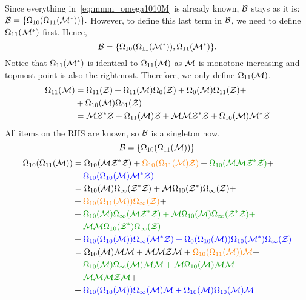 \documentclass[12pt, a4paper, twoside]{report}
\begin{document}
Since everything in~\eqref{eq:mmm_omega1010M} is already known, $\mathcal{B}$ stays as it is: $\mathcal{B} = \{\Omega_{10}(\Omega_{11}(\mathcal{M}^*))\}.$ However, to define this last term in $\mathcal{B}$, we need to define $\Omega_{11}(\mathcal{M}^*)$ first. Hence, $$\mathcal{B} = \{\Omega_{10}(\Omega_{11}(\mathcal{M}^*)), \Omega_{11}(\mathcal{M}^*)\}.$$ Notice that $\Omega_{11}(\mathcal{M}^*)$ is identical to $\Omega_{11}(\mathcal{M})$ as $\mathcal{M}$ is monotone increasing and topmost point is also the rightmost. Therefore, we only define $\Omega_{11}(\mathcal{M})$.
\begin{align}
  \begin{aligned}
    \Omega_{11}(\mathcal{M}) &= \Omega_{11}(\mathcal{Z}) + \Omega_{11}(\mathcal{M})\Omega_0(\mathcal{Z}) + \Omega_0(\mathcal{M})\Omega_{11}(\mathcal{Z}) +\\
    &+\Omega_{10}(\mathcal{M})\Omega_{01}(\mathcal{Z})\\
    &= \mathcal{M}\mathcal{Z}^*\mathcal{Z} + \Omega_{11}(\mathcal{M})\mathcal{Z} + \mathcal{M}\mathcal{M}\mathcal{Z}^*\mathcal{Z} + \Omega_{10}(\mathcal{M})\mathcal{M}^*\mathcal{Z}
  \end{aligned}
      \label{eq:mmm_omega11M}
\end{align}
All items on the RHS are known, so $\mathcal{B}$ is a singleton now. $$\mathcal{B} = \{\Omega_{10}(\Omega_{11}(\mathcal{M}))\}$$
\begin{align}
  \begin{aligned}
    \Omega_{10}(\Omega_{11}(\M)) &= \Omega_{10}(\M\Zstar\Z) + \textcolor{orange}{\Omega_{10}(\Omega_{11}(\M)\Z)} + \textcolor{green}{\Omega_{10}(\M\M\Zstar\Z)} +\\
    &+\textcolor{blue}{\Omega_{10}(\Omega_{10}(\M)\Mstar\Z)}\\
    &= \Omega_{10}(\M)\Omega_\infty(\Zstar\Z) + \M\Omega_{10}(\Zstar)\Omega_\infty(\Z) +\\
    &+ \textcolor{orange}{\Omega_{10}(\Omega_{11}(\M))\Omega_\infty(\Z)} +\\
    &+ \textcolor{green}{\Omega_{10}(\M)\Omega_\infty(\M\Zstar\Z) + \M\Omega_{10}(\M)\Omega_\infty(\Zstar\Z) +}\\
    &+ \textcolor{green}{\M\M\Omega_{10}(\Zstar)\Omega_\infty(\Z)}\\
    &+ \textcolor{blue}{\Omega_{10}(\Omega_{10}(\M))\Omega_\infty(\Mstar\Z) + \Omega_0(\Omega_{10}(\M))\Omega_{10}(\Mstar)\Omega_\infty(\Z)}\\
    &= \Omega_{10}(\M)\M\M + \M\M\Z\M + \textcolor{orange}{\Omega_{10}(\Omega_{11}(\M))\M} +\\
    &+ \textcolor{green}{\Omega_{10}(\M)\Omega_\infty(\M)\M\M + \M\Omega_{10}(\M)\M\M} +\\
    &+ \textcolor{green}{\M\M\M\Z\M} +\\
    &+ \textcolor{blue}{\Omega_{10}(\Omega_{10}(\M))\Omega_\infty(\M)\M + \Omega_{10}(\M)\Omega_{10}(\M)\M}
  \end{aligned}
      \label{eq:mmm_omega1011M}
\end{align}
\end{document}

